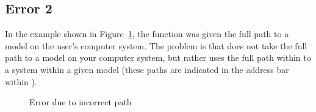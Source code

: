 \documentclass{mcscert}
\begin{document}
	\subsection*{Error 2}
	In the example shown in Figure~\ref{fig:error2}, the  function was given the full path to a model on the user's computer system. 
	The problem is that  does not take the full path to a model on your computer system, but rather uses the full path within \simulink{} to a system within a given model (these paths are indicated in the address bar within \simulink{}).
	\begin{figure}\centering
		\caption{Error due to incorrect path}
		\label{fig:error2}
	\end{figure}
\end{document}
